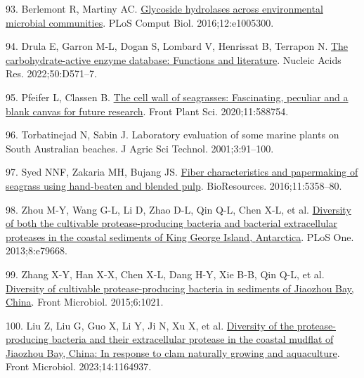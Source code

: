 \documentclass[
  12 pt,
]{article}
\newlength{\cslhangindent}
\newlength{\cslentryspacingunit} %
\newenvironment{CSLReferences}[2] %
 {%
  \setlength{\parindent}{0pt}
  \ifodd #1
  \let\oldpar\par
  \def\par{\hangindent=\cslhangindent\oldpar}
  \fi
  \setlength{\parskip}{#2\cslentryspacingunit}
 }%
 {}
\begin{document}
\begin{CSLReferences}{0}{0}
\leavevmode{}%
93. Berlemont R, Martiny AC. \href{https://doi.org/10.1371/journal.pcbi.1005300}{Glycoside hydrolases across environmental microbial communities}. PLoS Comput Biol. 2016;12:e1005300.

\leavevmode{}%
94. Drula E, Garron M-L, Dogan S, Lombard V, Henrissat B, Terrapon N. \href{https://doi.org/10.1093/nar/gkab1045}{The carbohydrate-active enzyme database: Functions and literature}. Nucleic Acids Res. 2022;50:D571--7.

\leavevmode{}%
95. Pfeifer L, Classen B. \href{https://doi.org/10.3389/fpls.2020.588754}{The cell wall of seagrasses: Fascinating, peculiar and a blank canvas for future research}. Front Plant Sci. 2020;11:588754.

\leavevmode{}%
96. Torbatinejad N, Sabin J. Laboratory evaluation of some marine plants on {South Australian} beaches. J Agric Sci Technol. 2001;3:91--100.

\leavevmode{}%
97. Syed NNF, Zakaria MH, Bujang JS. \href{https://doi.org/10.15376/biores.11.2.5358-5380}{Fiber characteristics and papermaking of seagrass using hand-beaten and blended pulp}. BioResources. 2016;11:5358--80.

\leavevmode{}%
98. Zhou M-Y, Wang G-L, Li D, Zhao D-L, Qin Q-L, Chen X-L, et al. \href{https://doi.org/10.1371/journal.pone.0079668}{Diversity of both the cultivable protease-producing bacteria and bacterial extracellular proteases in the coastal sediments of {King George Island}, {Antarctica}}. PLoS One. 2013;8:e79668.

\leavevmode{}%
99. Zhang X-Y, Han X-X, Chen X-L, Dang H-Y, Xie B-B, Qin Q-L, et al. \href{https://doi.org/10.3389/fmicb.2015.01021}{Diversity of cultivable protease-producing bacteria in sediments of {Jiaozhou Bay}, {China}}. Front Microbiol. 2015;6:1021.

\leavevmode{}%
100. Liu Z, Liu G, Guo X, Li Y, Ji N, Xu X, et al. \href{https://doi.org/10.3389/fmicb.2023.1164937}{Diversity of the protease-producing bacteria and their extracellular protease in the coastal mudflat of {Jiaozhou Bay}, {China}: In response to clam naturally growing and aquaculture}. Front Microbiol. 2023;14:1164937.


\end{CSLReferences}
\end{document}
